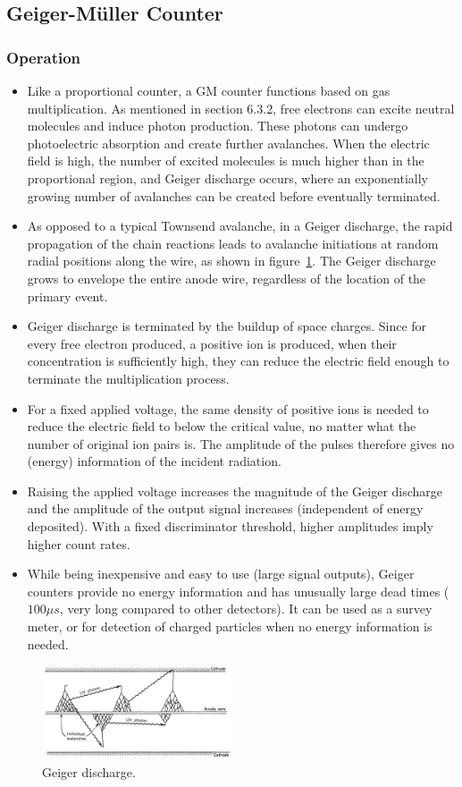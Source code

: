 \subsection{Geiger-Müller Counter}
\subsubsection{Operation}
\begin{itemize}
    \item Like a proportional counter, a GM counter functions based on gas multiplication. As mentioned in section 6.3.2, free electrons can excite neutral molecules and induce photon production. These photons can undergo photoelectric absorption and create further avalanches. When the electric field is high, the number of excited molecules is much higher than in the proportional region, and Geiger discharge occurs, where an exponentially growing number of avalanches can be created before eventually terminated.
    \item As opposed to a typical Townsend avalanche, in a Geiger discharge, the rapid propagation of the chain reactions leads to avalanche initiations at random radial positions along the wire, as shown in figure~\ref{fig:geiger_discharge}. The Geiger discharge grows to envelope the entire anode wire, regardless of the location of the primary event. 
    \item Geiger discharge is terminated by the buildup of space charges. Since for every free electron produced, a positive ion is produced,  when their concentration is sufficiently high, they can reduce the electric field enough to terminate the multiplication process. 
    \item For a fixed applied voltage, the same density of positive ions is needed to reduce the electric field to below the critical value, no matter what the number of original ion pairs is. The amplitude of the pulses therefore gives no (energy) information of the incident radiation. 
    \item Raising the applied voltage increases the magnitude of the Geiger discharge and the amplitude of the output signal increases (independent of energy deposited). With a fixed discriminator threshold, higher amplitudes imply higher count rates. 
    \item While being inexpensive and easy to use (large signal outputs), Geiger counters provide no energy information and has unusually large dead times ($100\mu s$, very long compared to other detectors). It can be used as a survey meter, or for detection of charged particles when no energy information is needed.
\end{itemize}
\begin{figure}[ht]
    \centering
    \includegraphics[width=0.5\textwidth]{images/geiger_discharge.png}
    \caption{Geiger discharge.}
    \label{fig:geiger_discharge}
\end{figure}
